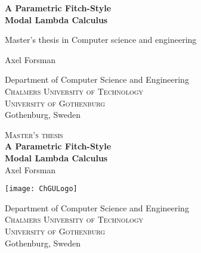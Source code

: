 \documentclass[12pt,twoside,openright]{report}
\numberwithin{equation}{chapter}
\numberwithin{figure}{chapter}
\numberwithin{table}{chapter}
\theoremstyle{definition}\newtheorem{definition}{Definition}
\newcommand{\multiLineTitle}[1]{A Parametric Fitch-Style \\[#1] Modal Lambda Calculus}
\begin{document}

\begin{titlepage}

\mbox{}
\vfill
\renewcommand{\familydefault}{\sfdefault}\normalfont

\textbf{\Huge \multiLineTitle{0.2cm}} \setlength{\parskip}{0.5cm}

Master's thesis in Computer science and engineering \setlength{\parskip}{1cm}

{\Large Axel Forsman} \setlength{\parskip}{2.9cm}

Department of Computer Science and Engineering \\
\textsc{Chalmers University of Technology} \\
\textsc{University of Gothenburg} \\
Gothenburg, Sweden \the\year
\end{titlepage}

\newpage
\renewcommand{\familydefault}{\rmdefault}\normalfont
\restoregeometry
\thispagestyle{empty}
\mbox{}

\newpage
\thispagestyle{empty}
\begin{center}
	\textsc{\large Master's thesis \the\year} \\[4cm]
	\textbf{\Large \multiLineTitle{0.2cm}} \\[2cm]
	{\large Axel Forsman}

	\vfill
    \begin{center}
	\texttt{[image: ChGULogo]}
    \end{center}
	\vspace{5mm}

	Department of Computer Science and Engineering \\
	\textsc{Chalmers University of Technology} \\
	\textsc{University of Gothenburg} \\
	Gothenburg, Sweden \the\year
\end{center}
\end{document}
